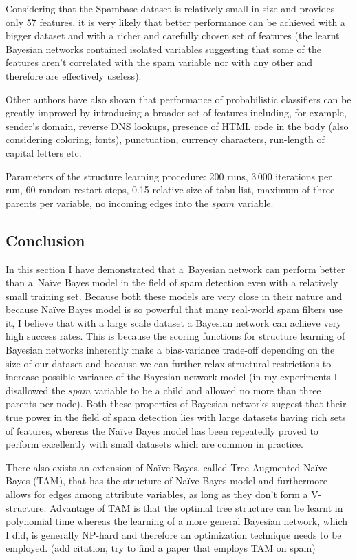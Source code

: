 \documentclass[english,cover]{fitthesis} %
\newcommand{\todo}[1]{{\color{red}#1}}
\begin{document}
Considering that the Spambase dataset is relatively small in size and provides only 57 features, it is very likely that better performance can be achieved with a bigger dataset and with a richer and carefully chosen set of features (the learnt Bayesian networks contained isolated variables suggesting that some of the features aren't correlated with the spam variable nor with any other and therefore are effectively useless).

Other authors have also shown that performance of probabilistic classifiers can be greatly improved by introducing a broader set of features including, for example, sender's domain, reverse DNS lookups, presence of HTML code in the body (also considering coloring, fonts), punctuation, currency characters, run-length of capital letters etc.~\cite{heckerman98_spam}

\medskip
Parameters of the structure learning procedure: 200 runs, 3\,000 iterations per run, 60 random restart steps, 0.15 relative size of tabu-list, maximum of three parents per variable, no incoming edges into the $spam$ variable.


\subsection{Conclusion}
In this section I have demonstrated that a~Bayesian network can perform better than a~Naïve Bayes model in the field of spam detection even with a relatively small training set. Because both these models are very close in their nature and because Naïve Bayes model is so powerful that many real-world spam filters use it, I believe that with a large scale dataset a Bayesian network can achieve very high success rates. This is because the scoring functions for structure learning of Bayesian networks inherently make a bias-variance trade-off depending on the size of our dataset and because we can further relax structural restrictions to increase possible variance of the Bayesian network model (in my experiments I disallowed the $spam$ variable to be a child and allowed no more than three parents per node). Both these properties of Bayesian networks suggest that their true power in the field of spam detection lies with large datasets having rich sets of features, whereas the Naïve Bayes model has been repeatedly proved to perform excellently with small datasets which are common in practice.

\todo{There also exists an extension of Naïve Bayes, called Tree Augmented Naïve Bayes (TAM), that has the structure of Naïve Bayes model and furthermore allows for edges among attribute variables, as long as they don't form a V-structure. Advantage of TAM is that the optimal tree structure can be learnt in polynomial time whereas the learning of a more general Bayesian network, which I did, is generally NP-hard and therefore an optimization technique needs to be employed. (add citation, try to find a paper that employs TAM on spam)}
\end{document}
